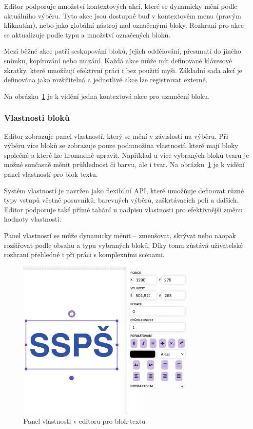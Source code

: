 Editor podporuje množství kontextových akcí, které se dynamicky mění podle aktuálního výběru. 
Tyto akce jsou dostupné buď v kontextovém menu (pravým kliknutím), nebo jako globální nástroj nad označenými bloky. 
Rozhraní pro akce se aktualizuje podle typu a množství označených bloků.

Mezi běžné akce patří seskupování bloků, jejich oddělování, přesunutí do jiného snímku, kopírování nebo mazání. 
Každá akce může mít definované klávesové zkratky, které umožňují efektivní práci i bez použití myši. 
Základní sada akcí je definována jako rozšiřitelná a jednotlivé akce lze registrovat externě.

Na obrázku~\ref{fig:realizace/vlastnosti} je k vidění jedna kontextová akce pro uzamčení bloku.


\subsubsection{Vlastnosti bloků}

Editor zobrazuje panel vlastností, který se mění v závislosti na výběru. 
Při výběru více bloků se zobrazuje pouze podmnožina vlastností, které mají bloky společné a které lze hromadně upravit. 
Například u více vybraných bloků tvaru je možné současně měnit průhlednost či barvu, ale i tvar.
Na obrázku~\ref{fig:realizace/vlastnosti} je k vidění panel vlastností pro blok textu.

Systém vlastností je navržen jako flexibilní API, které umožňuje definovat různé typy vstupů včetně posuvníků, barevných výběrů, zaškrtávacích polí a dalších. 
Editor podporuje také přímé tahání u nadpisu vlastnosti pro efektivnější změnu hodnoty vlastnosti.

Panel vlastností se může dynamicky měnit -- zmenšovat, skrývat nebo naopak rozšiřovat podle obsahu a typu vybraných bloků. 
Díky tomu zůstává uživatelské rozhraní přehledné i při práci s komplexními scénami.


\begin{figure}[ht!]
    \centering
    \includegraphics[width=0.8\textwidth]{media/05_realizace/vlastnosti.png}
    \caption{Panel vlastnosti v editoru pro blok textu}
    \label{fig:realizace/vlastnosti}
\end{figure}

